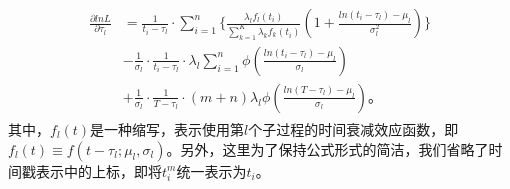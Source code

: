 \begin{eqnarray}
\label{eq:gradT}
\begin{split}
\frac{\partial lnL}{\partial \tau_l} &= \frac{1}{t_i-\tau_l} \cdot \sum_{i=1}^{n}\{ \frac{\lambda_l f_l(t_i)}{\sum_{k=1}^{K}\lambda_k f_k(t_i)}(1+\frac{ln(t_i-\tau_l)-\mu_l}{\sigma_l^2}) \} \\
& -\frac{1}{\sigma_l} \cdot \frac{1}{t_i-\tau_l}\cdot \lambda_l\sum_{i=1}^{n} \phi(\frac{ln(t_i-\tau_l)-\mu_l}{\sigma_l}) \\
& +\frac{1}{\sigma_l}\cdot \frac{1}{T-\tau_l}\cdot (m+n)\lambda_l\phi(\frac{ln(T-\tau_l)-\mu_l}{\sigma_l})\text{。}
\end{split}
\end{eqnarray}
其中，$f_l(t)$是一种缩写，表示使用第$l$个子过程的时间衰减效应函数，即$f_l(t) \equiv f(t-\tau_l;\mu_l,\sigma_l)$。另外，这里为了保持公式形式的简洁，我们省略了时间戳表示中的上标，即将$t_i^m$统一表示为$t_i$。

